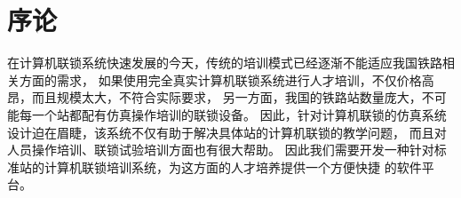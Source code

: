\section{序论}
在计算机联锁系统快速发展的今天，传统的培训模式已经逐渐不能适应我国铁路相关方面的需求，
如果使用完全真实计算机联锁系统进行人才培训，不仅价格高昂，而且规模太大，不符合实际要求，
另一方面，我国的铁路站数量庞大，不可能每一个站都配有仿真操作培训的联锁设备。
因此，针对计算机联锁的仿真系统设计迫在眉睫，该系统不仅有助于解决具体站的计算机联锁的教学问题，
而且对人员操作培训、联锁试验培训方面也有很大帮助。
因此我们需要开发一种针对标准站的计算机联锁培训系统，为这方面的人才培养提供一个方便快捷
的软件平台。